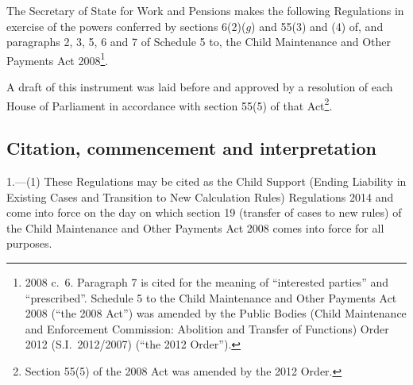 \documentclass[12pt,a4paper]{article}
\title{\regstitle}
\author{S.I.\ 2014 No.\ 614}
\date{Made
12th March 2014\\
Coming into force
in accordance with regulation 1(1)
}
\begin{document}
\maketitle

\enlargethispage{\baselineskip}

\noindent
The Secretary of State for Work and Pensions makes the following Regulations in exercise of the powers conferred by sections 6(2)($g$)  and 55(3) and (4) of, and paragraphs 2, 3, 5, 6 and 7 of Schedule 5 to, the Child Maintenance and Other Payments Act 2008\footnote{2008 c.~6. Paragraph 7 is cited for the meaning of “interested parties” and “prescribed”. Schedule 5 to the Child Maintenance and Other Payments Act 2008 (“the 2008 Act”) was amended by the Public Bodies (Child Maintenance and Enforcement Commission: Abolition and Transfer of Functions) Order 2012 (S.I.~2012/2007) (“the 2012 Order”).}.

A draft of this instrument was laid before and approved by a resolution of each House of Parliament in accordance with section 55(5) of that Act\footnote{Section 55(5) of the 2008 Act was amended by the 2012 Order.}. 

{\sloppy

\tableofcontents

}

\bigskip

\setcounter{secnumdepth}{-2}

\subsection[1. Citation, commencement and interpretation]{Citation, commencement and interpretation}

1.—(1) These Regulations may be cited as the Child Support (Ending Liability in Existing Cases and Transition to New Calculation Rules) Regulations 2014 and come into force on the day on which section 19 (transfer of cases to new rules) of the Child Maintenance and Other Payments Act 2008 comes into force for all purposes.
\end{document}
